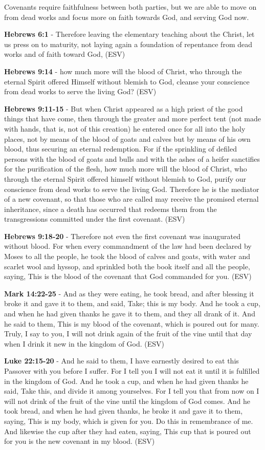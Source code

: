 \documentclass[11pt]{article}
\begin{document}
Covenants require faithfulness between both parties, but we are able to move on from dead works and focus more on faith towards God, and serving God now.

\textbf{Hebrews 6:1} - Therefore leaving the elementary teaching about the Christ, let us press on to maturity, not laying again a foundation of repentance from dead works and of faith toward God, (ESV)

\textbf{Hebrews 9:14} - how much more will the blood of Christ, who through the eternal Spirit offered Himself without blemish to God, cleanse your conscience from dead works to serve the living God? (ESV)

\textbf{Hebrews 9:11-15} - But when Christ appeared as a high priest of the good things that have come, then through the greater and more perfect tent (not made with hands, that is, not of this creation) he entered once for all into the holy places, not by means of the blood of goats and calves but by means of his own blood, thus securing an eternal redemption. For if the sprinkling of defiled persons with the blood of goats and bulls and with the ashes of a heifer sanctifies for the purification of the flesh, how much more will the blood of Christ, who through the eternal Spirit offered himself without blemish to God, purify our conscience from dead works to serve the living God. Therefore he is the mediator of a new covenant, so that those who are called may receive the promised eternal inheritance, since a death has occurred that redeems them from the transgressions committed under the first covenant. (ESV)

\textbf{Hebrews 9:18-20} - Therefore not even the first covenant was inaugurated without blood. For when every commandment of the law had been declared by Moses to all the people, he took the blood of calves and goats, with water and scarlet wool and hyssop, and sprinkled both the book itself and all the people, saying, This is the blood of the covenant that God commanded for you. (ESV)

\textbf{Mark 14:22-25} - And as they were eating, he took bread, and after blessing it broke it and gave it to them, and said, Take; this is my body. And he took a cup, and when he had given thanks he gave it to them, and they all drank of it. And he said to them, This is my blood of the covenant, which is poured out for many. Truly, I say to you, I will not drink again of the fruit of the vine until that day when I drink it new in the kingdom of God. (ESV)

\textbf{Luke 22:15-20} - And he said to them, I have earnestly desired to eat this Passover with you before I suffer. For I tell you I will not eat it until it is fulfilled in the kingdom of God. And he took a cup, and when he had given thanks he said, Take this, and divide it among yourselves. For I tell you that from now on I will not drink of the fruit of the vine until the kingdom of God comes. And he took bread, and when he had given thanks, he broke it and gave it to them, saying, This is my body, which is given for you. Do this in remembrance of me. And likewise the cup after they had eaten, saying, This cup that is poured out for you is the new covenant in my blood. (ESV)
\end{document}
